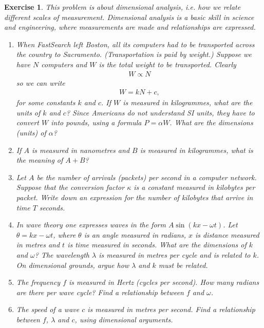 \documentclass{book}
\newtheorem{exercise}{Exercise}
\def\beq{\begin{eqnarray}}
\def\eeq{\end{eqnarray}}
\begin{document}
\begin{exercise} 
This problem is about dimensional analysis, i.e. how we relate
different scales of measurement. Dimensional analysis is a basic skill
in science and engineering, where measurements are made and relationships are
expressed.
\begin{enumerate}
\item When FastSearch left Boston, all its computers had to be transported
across the country to Sacramento. (Transportation is paid by weight.)
Suppose we  have $N$ computers and $W$ is the total weight to be
transported.
Clearly
\beq
W\propto N
\eeq
so we can write
\beq
W = kN +c,
\eeq
for some constants $k$ and $c$. If $W$ is measured in kilogrammes, what
are the units of $k$ and $c$? Since Americans do not understand SI units,
they have to convert $W$ into pounds, using a formula $P = \alpha W$.
What are the dimensions (units) of $\alpha$?

\item If $A$ is measured in nanometres and $B$ is measured in kilogrammes,
what is the meaning of $A+B$? 

\item Let $A$ be the number of arrivals (packets) per second in a computer
network. Suppose that the conversion factor $\kappa$ is a constant
measured in kilobytes per packet. Write down an expression for the
number of kilobytes that arrive in time $T$ seconds.

\item In wave theory one expresses waves in the form $A\sin(kx-\omega t)$.
Let $\theta = kx -\omega t$, where $\theta$ is an angle measured in radians,
$x$ is distance measured in metres and $t$ is time measured in seconds.
What are the dimensions of $k$ and $\omega$? The wavelength $\lambda$
is measured in metres per cycle and
is related to $k$. On dimensional grounds, argue how $\lambda$ and
$k$ must be related.

\item The frequency $f$ is measured in Hertz (cycles per second). 
How many radians are there
per wave cycle? Find a relationship between $f$ and $\omega$.

\item The speed of a wave $c$ is measured in metres per second.
Find a relationship between $f$, $\lambda$ and $c$, using
dimensional arguments.

\end{enumerate}
\end{exercise}
\begin{solution}
\end{solution}
\end{document}
